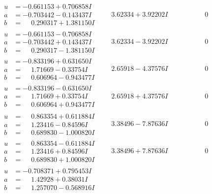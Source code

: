 \documentclass[1p]{elsarticle_modified}
\theoremstyle{definition}
\begin{document}
$$\begin{array}{c|c|c}
\begin{aligned}
u &= -0.661153 + 0.706858 I \\
a &= -0.703442 - 0.143437 I \\
b &= \phantom{-}0.290317 + 1.381150 I\end{aligned}
 & \phantom{-}3.62334 + 3.92202 I & \phantom{-0.000000 } 0 \\ \hline\begin{aligned}
u &= -0.661153 - 0.706858 I \\
a &= -0.703442 + 0.143437 I \\
b &= \phantom{-}0.290317 - 1.381150 I\end{aligned}
 & \phantom{-}3.62334 - 3.92202 I & \phantom{-0.000000 } 0 \\ \hline\begin{aligned}
u &= -0.833196 + 0.631650 I \\
a &= \phantom{-}1.71669 - 0.33754 I \\
b &= \phantom{-}0.606964 - 0.943477 I\end{aligned}
 & \phantom{-}2.65918 - 4.37576 I & \phantom{-0.000000 } 0 \\ \hline\begin{aligned}
u &= -0.833196 - 0.631650 I \\
a &= \phantom{-}1.71669 + 0.33754 I \\
b &= \phantom{-}0.606964 + 0.943477 I\end{aligned}
 & \phantom{-}2.65918 + 4.37576 I & \phantom{-0.000000 } 0 \\ \hline\begin{aligned}
u &= \phantom{-}0.863354 + 0.611884 I \\
a &= \phantom{-}1.23416 - 0.84596 I \\
b &= \phantom{-}0.689830 - 1.000820 I\end{aligned}
 & \phantom{-}3.38496 - 7.87636 I & \phantom{-0.000000 } 0 \\ \hline\begin{aligned}
u &= \phantom{-}0.863354 - 0.611884 I \\
a &= \phantom{-}1.23416 + 0.84596 I \\
b &= \phantom{-}0.689830 + 1.000820 I\end{aligned}
 & \phantom{-}3.38496 + 7.87636 I & \phantom{-0.000000 } 0 \\ \hline\begin{aligned}
u &= -0.708371 + 0.795453 I \\
a &= \phantom{-}1.42928 + 0.38031 I \\
b &= \phantom{-}1.257070 - 0.568916 I\end{aligned}

\end{array}$$
\end{document}
